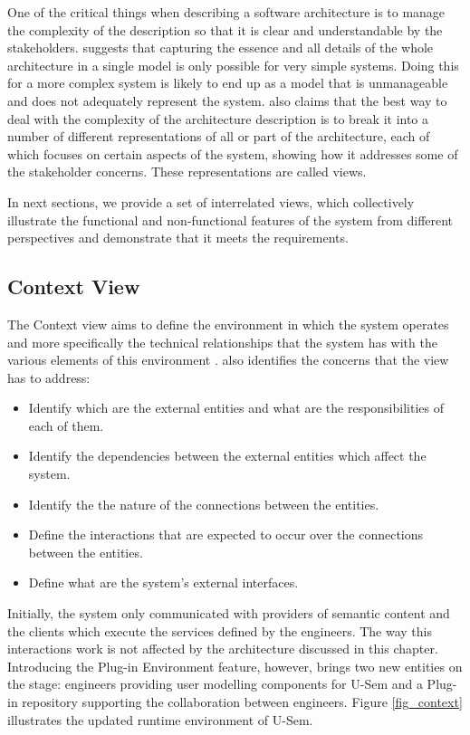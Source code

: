 One of the critical things when describing a software architecture is to manage the complexity of the description so that it is clear and understandable by the stakeholders. \cite{rozanski2011software} suggests that capturing the essence and all details of the whole architecture in a single model is only possible for very simple systems. Doing this for a more complex system is likely to end up as a model that is unmanageable and does not adequately represent the system. \cite{rozanski2011software} also claims that the best way to deal with the complexity of the architecture description is to break it into a number of different representations of all or part of the architecture, each of which focuses on certain aspects of the system, showing how it addresses some of the stakeholder concerns. These representations are called views.

In next sections, we provide a set of interrelated views, which collectively illustrate the functional and non-functional features of the system from different perspectives and demonstrate that it meets the requirements. 

\subsection{Context View}

The Context view aims to define the environment in which the system operates and more specifically the technical relationships that the system has with the various elements of this environment \cite{woods2009system}. \cite{woods2009system} also identifies the concerns that the view has to address:

\begin{itemize}
	\item Identify which are the external entities and what are the responsibilities of each of them.
	\item Identify the dependencies between the external entities which affect the system.
	\item Identify the the nature of the connections between the entities.
	\item Define the interactions that are expected to occur over the connections between the entities.
	\item Define what are the system's external interfaces.
\end{itemize}


Initially, the system only communicated with providers of semantic content and the clients which execute the services defined by the engineers. The way this interactions work is not affected by the architecture discussed in this chapter. Introducing the Plug-in Environment feature, however, brings two new entities on the stage: engineers providing user modelling components for U-Sem and a Plug-in repository supporting the collaboration between engineers. Figure \ref{fig_context} illustrates the updated runtime environment of U-Sem.


